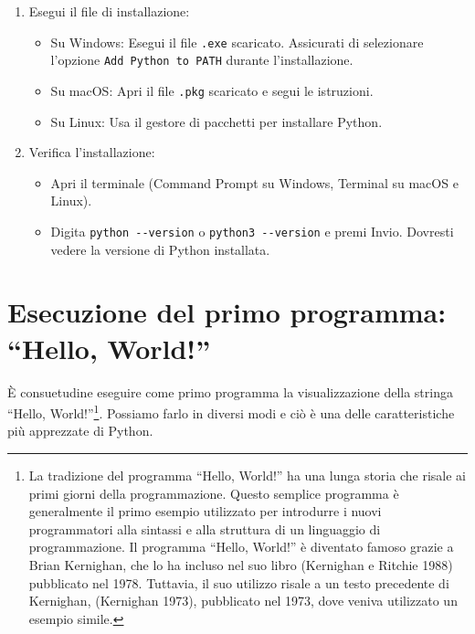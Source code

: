 \documentclass[
  letterpaper,
  DIV=11,
  numbers=noendperiod]{scrreprt}
\providecommand{\tightlist}{%
  \setlength{\itemsep}{0pt}\setlength{\parskip}{0pt}}\usepackage{longtable,booktabs,array}
\begin{document}
\begin{enumerate}
\def\labelenumi{\arabic{enumi}.}
\tightlist
\item
  Esegui il file di installazione:

  \begin{itemize}
  \tightlist
  \item
    Su Windows: Esegui il file \texttt{.exe} scaricato. Assicurati di
    selezionare l'opzione \texttt{Add\ Python\ to\ PATH} durante
    l'installazione.
  \item
    Su macOS: Apri il file \texttt{.pkg} scaricato e segui le
    istruzioni.
  \item
    Su Linux: Usa il gestore di pacchetti per installare Python.
  \end{itemize}
\item
  Verifica l'installazione:

  \begin{itemize}
  \tightlist
  \item
    Apri il terminale (Command Prompt su Windows, Terminal su macOS e
    Linux).
  \item
    Digita \texttt{python\ -\/-version} o \texttt{python3\ -\/-version}
    e premi Invio. Dovresti vedere la versione di Python installata.
  \end{itemize}
\end{enumerate}

\section{Esecuzione del primo programma: ``Hello,
World!''}\label{esecuzione-del-primo-programma-hello-world}

È consuetudine eseguire come primo programma la visualizzazione della
stringa ``Hello, World!''\footnote{La tradizione del programma ``Hello,
  World!'' ha una lunga storia che risale ai primi giorni della
  programmazione. Questo semplice programma è generalmente il primo
  esempio utilizzato per introdurre i nuovi programmatori alla sintassi
  e alla struttura di un linguaggio di programmazione. Il programma
  ``Hello, World!'' è diventato famoso grazie a Brian Kernighan, che lo
  ha incluso nel suo libro (Kernighan e Ritchie 1988) pubblicato nel
  1978. Tuttavia, il suo utilizzo risale a un testo precedente di
  Kernighan, (Kernighan 1973), pubblicato nel 1973, dove veniva
  utilizzato un esempio simile.}. Possiamo farlo in diversi modi e ciò è
una delle caratteristiche più apprezzate di Python.
\end{document}
